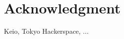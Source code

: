\documentclass[11pt]{article}
\begin{document}
\section*{Acknowledgment}
Keio, Tokyo Hackerspace, ...







\end{document}
